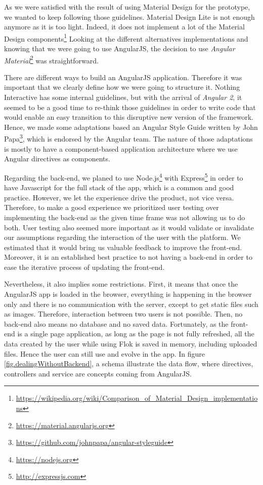 \documentclass[a4paper,12pt,twoside]{article}
\begin{document}
As we were satisfied with the result of using Material Design for the prototype, we wanted to keep following those guidelines.
Material Design Lite is not enough anymore as it is too light.
Indeed, it does not implement a lot of the Material Design components\footnote{\url{https://wikipedia.org/wiki/Comparison_of_Material_Design_implementations}}
Looking at the different alternatives implementations and knowing that we were going to use AngularJS, the decision to use \emph{Angular Material}\footnote{\url{https://material.angularjs.org}} was straightforward.

There are different ways to build an AngularJS application.
Therefore it was important that we clearly define how we were going to structure it.
Nothing Interactive has some internal guidelines, but with the arrival of \emph{Angular 2}, it seemed to be a good time to re-think those guidelines in order to write code that would enable an easy transition to this disruptive new version of the framework.
Hence, we made some adaptations based an Angular Style Guide written by John Papa\footnote{\url{https://github.com/johnpapa/angular-styleguide}}, which is endorsed by the Angular team.
The nature of those adaptations is mostly to have a component-based application architecture where we use Angular directives as components.

Regarding the back-end, we planed to use Node.js\footnote{\url{https://nodejs.org}} with Express\footnote{\url{http://expressjs.com}} in order to have Javascript for the full stack of the app, which is a common and good practice.
However, we let the experience drive the product, not vice versa.
Therefore, to make a good experience we prioritized user testing over implementing the back-end as the given time frame was not allowing us to do both.
User testing also seemed more important as it would validate or invalidate our assumptions regarding the interaction of the user with the platform.
We estimated that it would bring us valuable feedback to improve the front-end.
Moreover, it is an established best practice to not having a back-end in order to ease the iterative process of updating the front-end.

Nevertheless, it also implies some restrictions.
First, it means that once the AngularJS app is loaded in the browser, everything is happening in the browser only and there is no communication with the server, except to get static files such as images.
Therefore, interaction between two users is not possible.
Then, no back-end also means no database and no saved data.
Fortunately, as the front-end is a single page application, as long as the page is not fully refreshed, all the data created by the user while using Flok is saved in memory, including uploaded files.
Hence the user can still use and evolve in the app.
In figure \ref{fig.dealingWithoutBackend}, a schema illustrate the data flow, where directives, controllers and service are concepts coming from AngularJS.
\end{document}
